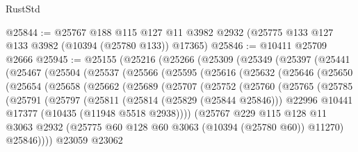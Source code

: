\begin{lexlean}{RustStd}
\begin{coremodule}
@25844 := @25767
    @188
    @115
    @127
    @11
    @3982
    @2932
    (@25775 @133 @127 @133 @3982 (@10394 (@25780 @133)) @17365)
@25846 := @10411 @25709 @2666
@25945 := @25155
    (@25216
      (@25266
        (@25309
          (@25349
            (@25397
              (@25441
                (@25467
                  (@25504
                    (@25537
                      (@25566
                        (@25595
                          (@25616
                            (@25632
                              (@25646
                                (@25650
                                  (@25654
                                    (@25658
                                      (@25662
                                        (@25689
                                          (@25707
                                            (@25752
                                              (@25760
                                                (@25765
                                                  (@25785
                                                    (@25791
                                                      (@25797
                                                        (@25811
                                                          (@25814 (@25829 (@25844 @25846)))
                                                          @22996
                                                          @10441
                                                          @17377
                                                          (@10435 (@11948 @5518 @2938))))
                                                      (@25767
                                                        @229
                                                        @115
                                                        @128
                                                        @11
                                                        @3063
                                                        @2932
                                                        (@25775
                                                          @60
                                                          @128
                                                          @60
                                                          @3063
                                                          (@10394 (@25780 @60))
                                                          @11270)
                                                        @25846))))
                                                @23059
                                                @23062

\end{coremodule}
\end{lexlean}
